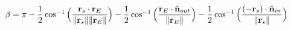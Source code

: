         \begin{theorem}
            \begin{equation*}
                \beta=\pi-\frac{1}{2}\cos^{-1}
                \Big(\frac{\mathbf{r}_{s}
                     \cdot\mathbf{r}_{E}}
                     {\lVert\mathbf{r}_{s}\rVert
                     \lVert\mathbf{r}_{E}\rVert}\Big)
                -\frac{1}{2}\cos^{-1}
                \Big(\frac{\mathbf{r}_{E}\cdot
                           \hat{\mathbf{n}}_{out}}
                          {\lVert\mathbf{r}_{E}\rVert}\Big)
                -\frac{1}{2}\cos^{-1}
                \Big(\frac{(-\mathbf{r}_{s})\cdot
                           \hat{\mathbf{n}}_{in}}
                          {\lVert\mathbf{r}_{s}\rVert}\Big)
            \end{equation*}
        \end{theorem}
